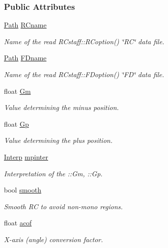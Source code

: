 \subsubsection*{Public Attributes}
\begin{DoxyCompactItemize}
\item 
\hyperlink{classPath}{Path} \hyperlink{structEDEIoptions_af7da15cddac94d6eff13df82cb8c07fa}{RCname}
\begin{DoxyCompactList}\small\item\em Name of the read RCstaff::RCoption() \char`\"{}RC\char`\"{} data file. \item\end{DoxyCompactList}\item 
\hyperlink{classPath}{Path} \hyperlink{structEDEIoptions_a50ffef2f3656fc6b72cbb801d722c4f9}{FDname}
\begin{DoxyCompactList}\small\item\em Name of the read RCstaff::FDoption() \char`\"{}FD\char`\"{} data file. \item\end{DoxyCompactList}\item 
float \hyperlink{structEDEIoptions_a293daefe2fbeb36296107fd1db32640c}{Gm}
\begin{DoxyCompactList}\small\item\em Value determining the minus position. \item\end{DoxyCompactList}\item 
float \hyperlink{structEDEIoptions_a849c6335c3368bb43cc774e27ab9103d}{Gp}
\begin{DoxyCompactList}\small\item\em Value determining the plus position. \item\end{DoxyCompactList}\item 
\hyperlink{classInterp}{Interp} \hyperlink{structEDEIoptions_a8b89e570e1103169de51b967713a0b80}{mpinter}
\begin{DoxyCompactList}\small\item\em Interpretation of the ::Gm, ::Gp. \item\end{DoxyCompactList}\item 
bool \hyperlink{structEDEIoptions_a488f675984a6d3c72b6b8f70422f8c2f}{smooth}
\begin{DoxyCompactList}\small\item\em Smooth RC to avoid non-\/mono regions. \item\end{DoxyCompactList}\item 
float \hyperlink{structEDEIoptions_a6a32d7dfbbb0c5af80dfa73e4bef35f2}{acof}
\begin{DoxyCompactList}\small\item\em X-\/axis (angle) conversion factor. \item\end{DoxyCompactList}\end{DoxyCompactItemize}
